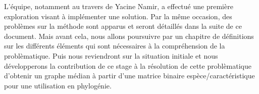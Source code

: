 \bigbreak

L'équipe, notamment au travers de Yacine Namir, a effectué une première exploration \cite{egc2018} visant à implémenter une solution. Par la même occasion, des problèmes sur la méthode sont apparus et seront détaillés dans la suite de ce document. Mais avant cela, nous allons poursuivre par un chapitre de définitions sur les différents éléments qui sont nécessaires à la compréhension de la problèmatique. Puis nous reviendront sur la situation initiale et nous développerons la contribution de ce stage à la résolution de cette problèmatique d'obtenir un graphe médian à partir d'une matrice binaire espèce/caractéristique pour une utilisation en phylogénie.
